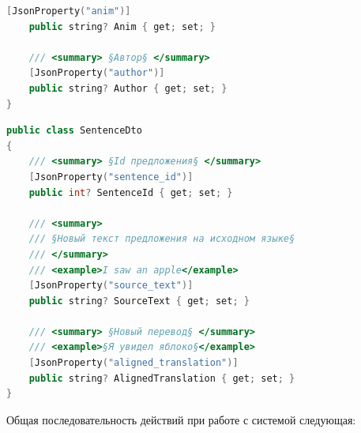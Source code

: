 \begin{lstlisting}[title={Окончание листинга \ref{dto4}}, language=c++, label=dto41, firstnumber=24]
	[JsonProperty("anim")]
	public string? Anim { get; set; }
	
	/// <summary> §Автор§ </summary>
	[JsonProperty("author")]
	public string? Author { get; set; }
}
\end{lstlisting}

\begin{lstlisting}[caption={SentenceDto}, language=c++, label=dto5]
public class SentenceDto
{
	/// <summary> §Id предложения§ </summary>
	[JsonProperty("sentence_id")]
	public int? SentenceId { get; set; }
	
	/// <summary> 
	/// §Новый текст предложения на исходном языке§ 
	/// </summary>
	/// <example>I saw an apple</example>
	[JsonProperty("source_text")]
	public string? SourceText { get; set; }
	
	/// <summary> §Новый перевод§ </summary>
	/// <example>§Я увидел яблоко§</example>
	[JsonProperty("aligned_translation")]
	public string? AlignedTranslation { get; set; }
}
\end{lstlisting}
\newpage
Общая последовательность действий при работе с системой следующая:
